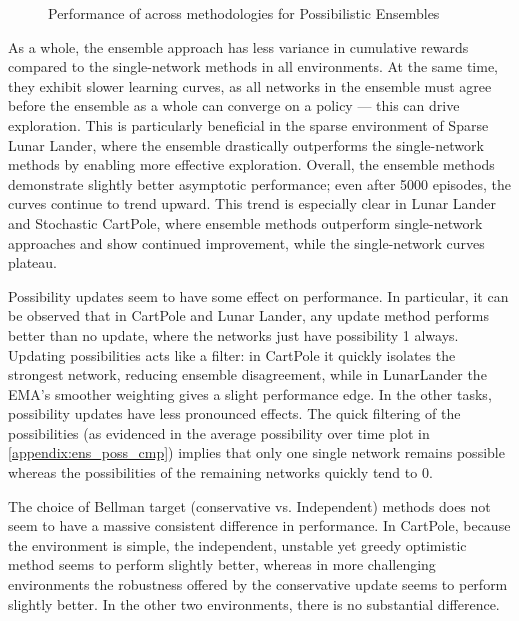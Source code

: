 \documentclass[11pt,a4paper]{report}
\begin{document}
{\begin{figure}[ht]
  \caption{Performance of across methodologies for Possibilistic Ensembles} %
  \label{fig:ens_combined} %
\end{figure}

} %

As a whole, the ensemble approach has less variance in cumulative rewards compared to the single-network methods in all environments. At the same time, they exhibit slower learning curves, as all networks in the ensemble must agree before the ensemble as a whole can converge on a policy — this can drive exploration. This is particularly beneficial in the sparse environment of Sparse Lunar Lander, where the ensemble drastically outperforms the single-network methods by enabling more effective exploration. Overall, the ensemble methods demonstrate slightly better asymptotic performance; even after 5000 episodes, the curves continue to trend upward. This trend is especially clear in Lunar Lander and Stochastic CartPole, where ensemble methods outperform single-network approaches and show continued improvement, while the single-network curves plateau.

\par Possibility updates seem to have some effect on performance. In particular, it can be observed that in CartPole and Lunar Lander, any update method performs better than no update, where the networks just have possibility 1 always. Updating possibilities acts like a filter: in CartPole it quickly isolates the strongest network, reducing ensemble disagreement, while in LunarLander the EMA’s smoother weighting gives a slight performance edge. In the other tasks, possibility updates have less pronounced effects. The quick filtering of the possibilities (as evidenced in the average possibility over time plot in \ref{appendix:ens_poss_cmp}) implies that only one single network remains possible whereas the possibilities of the remaining networks quickly tend to 0.  

\par The choice of Bellman target (conservative vs. Independent) methods does not seem to have a massive consistent difference in performance. In CartPole, because the environment is simple, the independent, unstable yet greedy optimistic method seems to perform slightly better, whereas in more challenging environments the robustness offered by the conservative update seems to perform slightly better. In the other two environments, there is no substantial difference.
\end{document}
